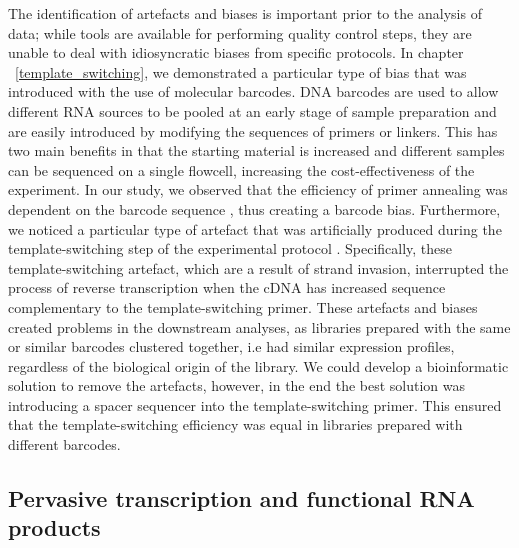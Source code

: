 The identification of artefacts and biases is important prior to the analysis of data; while tools \citep{pmid19737799} are available for performing quality control steps, they are unable to deal with idiosyncratic biases from specific protocols. In chapter ~\ref{template_switching}, we demonstrated a particular type of bias that was introduced with the use of molecular barcodes. DNA barcodes are used to allow different RNA sources to be pooled at an early stage of sample preparation and are easily introduced by modifying the sequences of primers or linkers. This has two main benefits in that the starting material is increased and different samples can be sequenced on a single flowcell, increasing the cost-effectiveness of the experiment. In our study, we observed that the efficiency of primer annealing was dependent on the barcode sequence \citep{Tang01022013}, thus creating a barcode bias. Furthermore, we noticed a particular type of artefact that was artificially produced during the template-switching step of the experimental protocol \citep{Tang01022013}. Specifically, these template-switching artefact, which are a result of strand invasion, interrupted the process of reverse transcription when the cDNA has increased sequence complementary to the template-switching primer. These artefacts and biases created problems in the downstream analyses, as libraries prepared with the same or similar barcodes clustered together, i.e had similar expression profiles, regardless of the biological origin of the library. We could develop a bioinformatic solution to remove the artefacts, however, in the end the best solution was introducing a spacer sequencer into the template-switching primer. This ensured that the template-switching efficiency was equal in libraries prepared with different barcodes.

\subsection{Pervasive transcription and functional RNA products}

